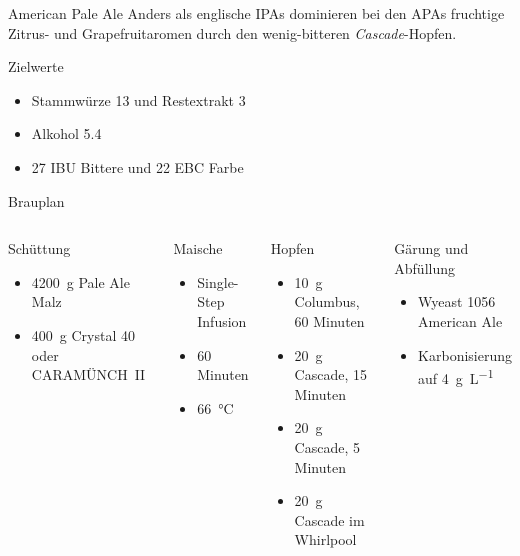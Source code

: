 \documentclass[9pt, ngerman]{beamer}
\begin{document}
\begin{frame}{American Pale Ale}
  Anders als englische IPAs dominieren bei den APAs fruchtige Zitrus- und
  Grapefruitaromen durch den wenig-bitteren \emph{Cascade}-Hopfen.

  \begin{block}{Zielwerte}
    \begin{itemize}
      \item Stammwürze \SI{13}{\dP} und Restextrakt \SI{3}{\dP}
      \item Alkohol \SI{5.4}{\volP}
      \item 27 IBU Bittere und 22 EBC Farbe
    \end{itemize}
  \end{block}
\end{frame}
\begin{frame}{Brauplan}
  \begin{columns}[T, onlytextwidth]
      \begin{block}{Schüttung}
        \begin{itemize}
          \item \SI{4200}{\gram} Pale Ale Malz
          \item \SI{400}{\gram} Crystal 40 oder CARAMÜNCH\textregistered\  II
        \end{itemize}
      \end{block}
      \begin{block}{Maische}
        \begin{itemize}
          \item Single-Step Infusion
          \item 60 Minuten
          \item \SI{66}{\celsius}
        \end{itemize}
      \end{block}

      \begin{block}{Hopfen}
        \begin{itemize}
          \item \SI{10}{\gram} Columbus, 60 Minuten
          \item \SI{20}{\gram} Cascade, 15 Minuten
          \item \SI{20}{\gram} Cascade, 5 Minuten
          \item \SI{20}{\gram} Cascade im Whirlpool
        \end{itemize}
      \end{block}
      \begin{block}{Gärung und Abfüllung}
        \begin{itemize}
          \item Wyeast 1056 American Ale
          \item Karbonisierung auf \SI{4}{\gram\per\liter} 
        \end{itemize}
      \end{block}

  \end{columns}
\end{frame}
\end{document}
